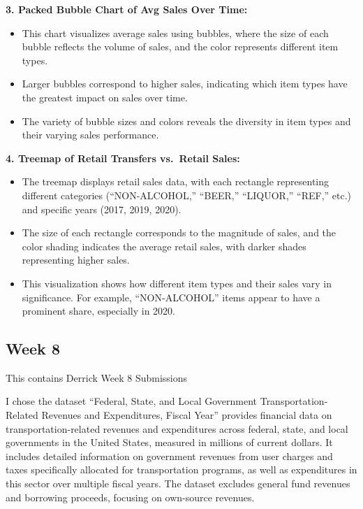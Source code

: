 \documentclass[
  letterpaper,
  DIV=11,
  numbers=noendperiod]{scrreprt}
\begin{document}
\textbf{3. Packed Bubble Chart of Avg Sales Over Time:}

\begin{itemize}
\item
  This chart visualizes average sales using bubbles, where the size of
  each bubble reflects the volume of sales, and the color represents
  different item types.
\item
  Larger bubbles correspond to higher sales, indicating which item types
  have the greatest impact on sales over time.
\item
  The variety of bubble sizes and colors reveals the diversity in item
  types and their varying sales performance.
\end{itemize}

\textbf{4. Treemap of Retail Transfers vs.~Retail Sales:}

\begin{itemize}
\item
  The treemap displays retail sales data, with each rectangle
  representing different categories (``NON-ALCOHOL,'' ``BEER,''
  ``LIQUOR,'' ``REF,'' etc.) and specific years (2017, 2019, 2020).
\item
  The size of each rectangle corresponds to the magnitude of sales, and
  the color shading indicates the average retail sales, with darker
  shades representing higher sales.
\item
  This visualization shows how different item types and their sales vary
  in significance. For example, ``NON-ALCOHOL'' items appear to have a
  prominent share, especially in 2020.
\end{itemize}

\subsection{Week 8}\label{week-8-1}

This contains Derrick Week 8 Submissions

I chose the dataset ``Federal, State, and Local Government
Transportation-Related Revenues and Expenditures, Fiscal Year'' provides
financial data on transportation-related revenues and expenditures
across federal, state, and local governments in the United States,
measured in millions of current dollars. It includes detailed
information on government revenues from user charges and taxes
specifically allocated for transportation programs, as well as
expenditures in this sector over multiple fiscal years. The dataset
excludes general fund revenues and borrowing proceeds, focusing on
own-source revenues.
\end{document}
